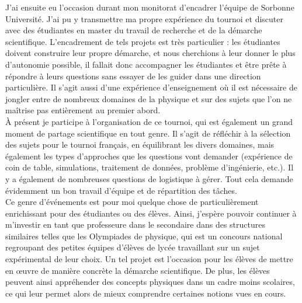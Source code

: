 \documentclass[a4paper,11pt]{article} %
\newcommand{\pointmedian}{{\fontfamily{cmr}\selectfont\textperiodcentered}}
\begin{document}
	J'ai ensuite eu l'occasion durant mon monitorat d'encadrer l'équipe de Sorbonne Université. J'ai pu y transmettre ma propre expérience du tournoi et discuter avec des étudiant\pointmedian es en master du travail de recherche et de la démarche scientifique. L'encadrement de tels projets est très particulier : les étudiant\pointmedian es doivent construire leur propre démarche, et nous cherchions à leur donner le plus d'autonomie possible, il fallait donc accompagner les étudiant\pointmedian es et être prête à répondre à leurs questions sans essayer de les guider dans une direction particulière. Il s'agit aussi d'une expérience d'enseignement où il est nécessaire de jongler entre de nombreux domaines de la physique et sur des sujets que l'on ne maîtrise pas entièrement au premier abord.\\
	
	\`A présent je participe à l'organisation de ce tournoi, qui est également un grand moment de partage scientifique en tout genre. Il s'agit de réfléchir à la sélection des sujets pour le tournoi français, en équilibrant les divers domaines, mais également les types d'approches que les questions vont demander (expérience de coin de table, simulations, traitement de données, problème d'ingénierie, etc.). Il y a également de nombreuses questions de logistique à gérer. Tout cela demande évidemment un bon travail d'équipe et de répartition des tâches.\\ %
	
	Ce genre d'événements est pour moi quelque chose de particulièrement enrichissant pour des étudiant\pointmedian{}es ou des élèves. Ainsi, j'espère pouvoir continuer à m'investir en tant que professeure dans le secondaire dans des structures similaires telles que les Olympiades de physique, qui est un concours national regroupant des petites équipes d'élèves de lycée travaillant sur un sujet expérimental de leur choix. Un tel projet est l'occasion pour les élèves de mettre en \oe{}uvre de manière concrète la démarche scientifique. De plus, les élèves peuvent ainsi appréhender des concepts physiques dans un cadre moins scolaires, ce qui leur permet alors de mieux comprendre certaines notions vues en cours.
	
	
\end{document}
